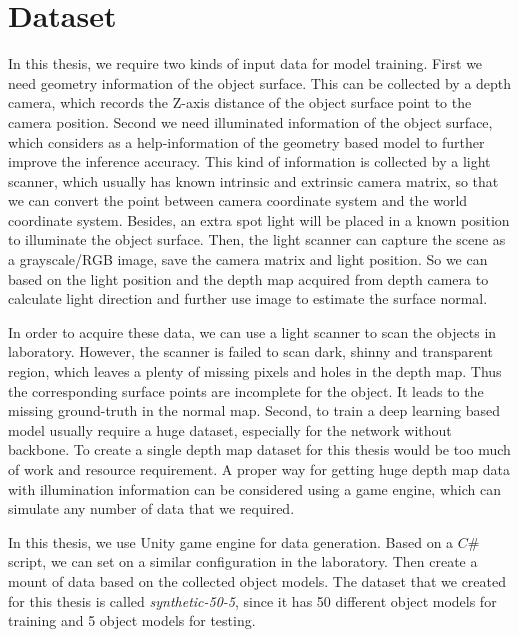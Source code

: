 
\chapter{Dataset} %

\label{ch:04} %


 In this thesis, we require two kinds of input data for model training. 
First we need geometry information of the object surface. This can be collected by a depth camera, which records the Z-axis distance of the object surface point to the camera position. 
Second we need illuminated information of the object surface, which considers as a help-information of the geometry based model to further improve the inference accuracy. This kind of information is collected by a light scanner, which usually has known intrinsic and extrinsic camera matrix, so that we can convert the point between camera coordinate system and the world coordinate system. Besides, an extra spot light will be placed in a known position to illuminate the object surface. Then, the light scanner can capture the scene as a grayscale/RGB image, save the camera matrix and light position. So we can based on the light position and the depth map acquired from depth camera to calculate light direction and further use image to estimate the surface normal.

In order to acquire these data, we can use a light scanner to scan the objects in laboratory. However, the scanner is failed to scan dark, shinny and transparent region, which leaves a plenty of missing pixels and holes in the depth map. Thus the corresponding surface points are incomplete for the object. It leads to the missing ground-truth in the normal map. Second, to train a deep learning based model usually require a huge dataset, especially for the network without backbone. To create a single depth map dataset for this thesis would be too much of work and resource requirement. A proper way for getting huge depth map data with illumination information can be considered using a game engine, which can simulate any number of data that we required.

In this thesis, we use Unity game engine for data generation. Based on a $ C\# $ script, we can set on a similar configuration in the laboratory. Then create a mount of data based on the collected object models. The dataset that we created for this thesis is called \textit{synthetic-50-5}, since it has 50 different object models for training and 5 object models for testing.



